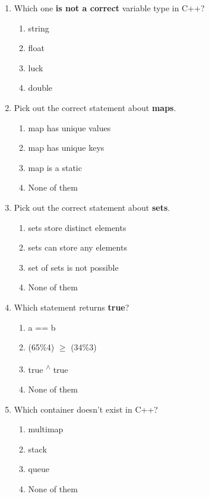 \documentclass[10pt]{article}
\begin{document}
\begin{enumerate}
\item Which one \textbf{is not a correct} variable type in C++?
\begin{multicols}{4}
\begin{enumerate}
    \item string
    \item float
    \item luck 
    \item double
\end{enumerate}
\end{multicols}

\item Pick out the correct statement about \textbf{maps}.
\begin{enumerate}
    \item map has unique values
    \item map has unique keys 
    \item map is a static
    \item None of them
\end{enumerate}

\item Pick out the correct statement about \textbf{sets}.
\begin{enumerate}
    \item sets store distinct elements 
    \item sets can store any elements
    \item set of sets is not possible
    \item None of them
\end{enumerate}



\item Which statement returns \textbf{true}?
\begin{enumerate}
    \item a == b
    \item (65\%4) $\geq$ (34\%3) 
    \item true \textsuperscript{$\wedge$} true
    \item None of them
\end{enumerate}




\item Which container doesn’t exist in C++?
\begin{multicols}{4}
\begin{enumerate}
    \item multimap
    \item stack
    \item queue
    \item None of them 
\end{enumerate}
\end{multicols}




\end{enumerate}
\end{document}
